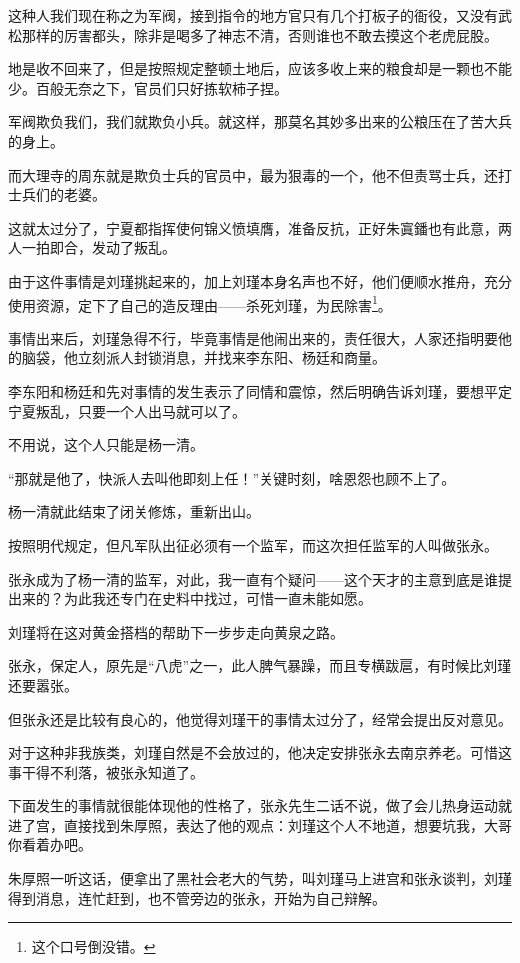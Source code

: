 \begin{multicols}{\theparacolNo}
这种人我们现在称之为军阀，接到指令的地方官只有几个打板子的衙役，又没有武松那样的厉害都头，除非是喝多了神志不清，否则谁也不敢去摸这个老虎屁股。

地是收不回来了，但是按照规定整顿土地后，应该多收上来的粮食却是一颗也不能少。百般无奈之下，官员们只好拣软柿子捏。

军阀欺负我们，我们就欺负小兵。就这样，那莫名其妙多出来的公粮压在了苦大兵的身上。

而大理寺的周东就是欺负士兵的官员中，最为狠毒的一个，他不但责骂士兵，还打士兵们的老婆。

这就太过分了，宁夏都指挥使何锦义愤填膺，准备反抗，正好朱寘鐇也有此意，两人一拍即合，发动了叛乱。

由于这件事情是刘瑾挑起来的，加上刘瑾本身名声也不好，他们便顺水推舟，充分使用资源，定下了自己的造反理由——杀死刘瑾，为民除害\footnote{这个口号倒没错。}。

事情出来后，刘瑾急得不行，毕竟事情是他闹出来的，责任很大，人家还指明要他的脑袋，他立刻派人封锁消息，并找来李东阳、杨廷和商量。

李东阳和杨廷和先对事情的发生表示了同情和震惊，然后明确告诉刘瑾，要想平定宁夏叛乱，只要一个人出马就可以了。

不用说，这个人只能是杨一清。

“那就是他了，快派人去叫他即刻上任！”关键时刻，啥恩怨也顾不上了。

杨一清就此结束了闭关修炼，重新出山。

按照明代规定，但凡军队出征必须有一个监军，而这次担任监军的人叫做张永。

张永成为了杨一清的监军，对此，我一直有个疑问——这个天才的主意到底是谁提出来的？为此我还专门在史料中找过，可惜一直未能如愿。

刘瑾将在这对黄金搭档的帮助下一步步走向黄泉之路。

张永，保定人，原先是“八虎”之一，此人脾气暴躁，而且专横跋扈，有时候比刘瑾还要嚣张。

但张永还是比较有良心的，他觉得刘瑾干的事情太过分了，经常会提出反对意见。

对于这种非我族类，刘瑾自然是不会放过的，他决定安排张永去南京养老。可惜这事干得不利落，被张永知道了。

下面发生的事情就很能体现他的性格了，张永先生二话不说，做了会儿热身运动就进了宫，直接找到朱厚照，表达了他的观点：刘瑾这个人不地道，想要坑我，大哥你看着办吧。

朱厚照一听这话，便拿出了黑社会老大的气势，叫刘瑾马上进宫和张永谈判，刘瑾得到消息，连忙赶到，也不管旁边的张永，开始为自己辩解。


\end{multicols}

